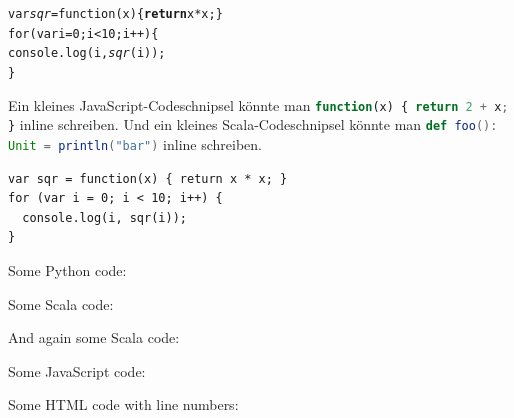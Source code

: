 \documentclass[a4paper, 12pt, hidelinks, listof=totoc, listoftables=totoc, bibliography=totoc]{scrreprt}
\begin{document}
\begin{alltt}
var \emph{sqr} = function(x) \{ \textbf{return} x * x; \}
for (var i = 0; i < 10; i++) \{
  console.log(i, \emph{sqr}(i));
\}
\end{alltt}


Ein kleines JavaScript-Codeschnipsel könnte man \lstinline[language=JavaScript, style=inline]!function(x) { return 2 + x; }! inline schreiben. Und ein kleines Scala-Codeschnipsel könnte man \lstinline[language=Scala, style=inline]|def foo(): Unit = println("bar")| inline schreiben.


\begin{lstlisting}
var sqr = function(x) { return x * x; }
for (var i = 0; i < 10; i++) {
  console.log(i, sqr(i));
}
\end{lstlisting}

Some Python code:





Some Scala code:


And again some Scala code:





Some JavaScript code:





Some HTML code with line numbers:







\listoffigures

\listoftables
\end{document}
